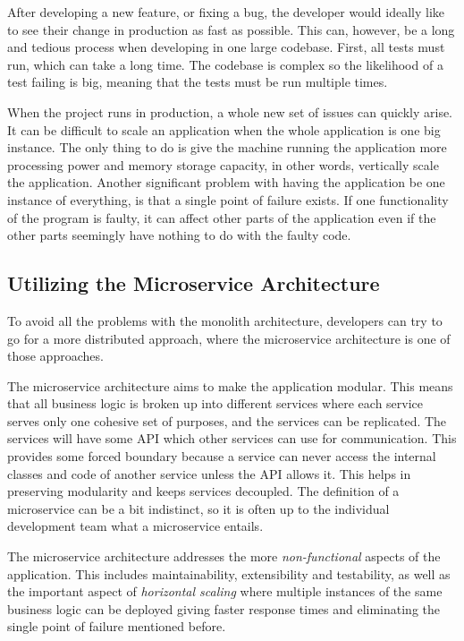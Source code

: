 After developing a new feature, or fixing a bug, the developer would ideally like to see their change 
in production as fast as possible. This can, however, be a long and tedious process when developing in one large codebase.
First, all tests must run, which can take a long time. The codebase is complex so the likelihood of a 
test failing is big, meaning that the tests must be run multiple times.

When the project runs in production, a whole new set of issues can quickly arise. It can be difficult
to scale an application when the whole application is one big instance.
The only thing to do is give the machine running the application more processing power and memory 
storage capacity, in other words, vertically scale the application. Another significant problem with having the application be one instance of everything, is that a single point of failure exists. If one functionality of the program is faulty, it can affect other parts of the application
even if the other parts seemingly have nothing to do with the faulty code.

\subsection{Utilizing the Microservice Architecture}
To avoid all the problems with the monolith architecture, developers can try to go for a more
 distributed approach, where the microservice architecture is one of those approaches.

The microservice architecture aims to make the application modular. This means that all business logic is broken up into different services 
where each service serves only one cohesive set of purposes, and the services can be replicated.
The services will have some API which other services can use for communication. This provides some forced boundary because a service can never access the internal classes and code of another service unless the API allows it.
This helps in preserving modularity and keeps services decoupled.
The definition of a microservice can be a bit indistinct, so it is often up to the individual development team what a microservice entails.

The microservice architecture addresses the more \textit{non-functional} aspects of the application.
This includes maintainability, extensibility and testability, as well as the important aspect of
\textit{horizontal scaling} where multiple instances of the same business logic can be deployed giving 
faster response times and eliminating the single point of failure mentioned before.

